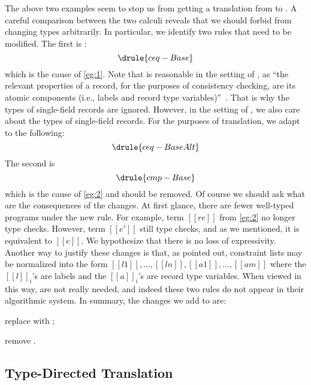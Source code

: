 The above two examples seem to stop us from getting a translation from \rname to
\fnamee. A careful comparison between the two calculi reveals that we should
forbid \rname from changing types arbitrarily. In particular, we identify two
rules that need to be modified. The first is :
\[
  \drule{ceq-Base}
\]
which is the cause of \cref{eg:1}. Note that  is reasonable
in the setting of \rname, as ``the relevant properties of a record, for the
purposes of consistency checking, are its atomic components (i.e., labels and
record type variables)''~\cite{Harper:1991:RCB:99583.99603}. That is why the
types of single-field records are ignored. However, in the setting of \fnamee,
we also care about the types of single-field records. For the purposes of
translation, we adapt  to the following:
\[
  \drule{ceq-BaseAlt}
\]
The second is 
\[
  \drule{cmp-Base}
\]
which is the cause of \cref{eg:2} and should be removed. Of course we should ask
what are the consequences of the changes. At first glance, there are fewer
well-typed programs under the new rule. For example, term $[[re]]$ from
\cref{eg:2} no longer type checks. However, term $[[e']]$ still type checks, and
as we mentioned, it is equivalent to $[[e]]$. We hypothesize that there is no
loss of expressivity. Another way to justify these changes is that, as
\cite{Harper:1991:RCB:99583.99603} pointed out, constraint lists may be
normalized into the form $[[l1]], \dots, [[ln]], [[a1]] , \dots, [[am]]$ where
the $[[l]]_i$'s are labels and the $[[a]]_i$'s are record type variables. When
viewed in this way,  are not really needed, and indeed
these two rules do not appear in their algorithmic system.
In summary, the changes we add to \rname are:
\begin{inparaenum}[(1)]
\item replace  with ;
\item remove .
\end{inparaenum}


\subsection{Type-Directed Translation}
\label{sec:row_trans}

